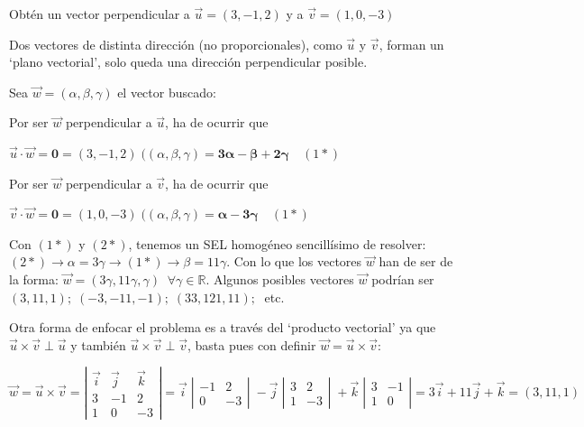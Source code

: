 \begin{ejre}
	Obtén un vector perpendicular a $\vec u=(3,-1,2)$ y a $\vec v=(1,0,-3)$
\end{ejre}

\begin{proofw}\renewcommand{\qedsymbol}{$\diamond$}
	Dos vectores de distinta dirección (no proporcionales), como $\vec u$ y $\vec v$, forman un `plano vectorial', solo queda una dirección perpendicular posible.
	
\noindent Sea $\vec w=(\alpha, \beta, \gamma)$ el vector buscado:

\noindent Por ser $\vec w$ perpendicular a $\vec u$, ha de ocurrir que 

$\vec u \cdot \vec w=\boldsymbol{ 0}=(3,-1,2)\; ((\alpha, \beta, \gamma)=\boldsymbol{ 3\alpha-\beta+2\gamma}\quad (1*)$ 

\noindent Por ser $\vec w$ perpendicular a $\vec v$, ha de ocurrir que 

$\vec v \cdot \vec w=\boldsymbol{ 0}=(1,0,-3)\; ((\alpha, \beta, \gamma)=\boldsymbol{ \alpha-3\gamma}\quad (1*)$ 

\noindent Con $(1*)$ y $(2*)$, tenemos un SEL homogéneo sencillísimo de resolver: $(2*)\to \alpha=3\gamma \to (1*)\to \beta=11\gamma$. Con lo que los vectores $\vec w$ han de ser de la forma: $\vec w=(3\gamma, 11\gamma, \gamma)\; \; \forall \gamma \in \mathbb R$. Algunos posibles vectores $\vec w$ podrían ser $(3,11,1); \; (-3,-11,-1); \; (33,121,11); \; $ etc.

Otra forma de enfocar el problema es a través del `producto vectorial' ya que $\vec u \times \vec v \; \bot \; \vec u$ y también $\vec u \times \vec v \; \bot \; \vec v$, basta pues con definir $\vec w=\vec u \times \vec v$:

\noindent $\vec w =\vec u \times \vec v=\left| \begin{matrix} \vec i & \vec j & \vec k \\ 3&-1&2 \\ 1&0&-3 \end{matrix} \right|=  \vec i \; \left| \begin{matrix}  -1&2 \\ 0&-3 \end{matrix} \right| \; - 
\vec j \; \left| \begin{matrix}  3&2 \\ 1&-3 \end{matrix} \right| \; +
\vec k \; \left| \begin{matrix}  3&-1 \\ 1&0 \end{matrix} \right| =3\vec i +11\vec j + \vec k=(3,11,1)$ 

\end{proofw}


